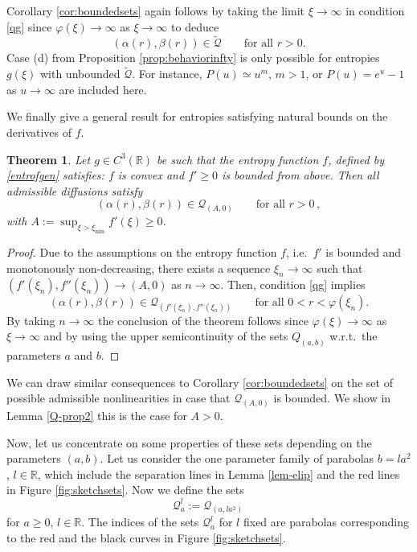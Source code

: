 \documentclass[reqno]{amsart}
\newtheorem{theorem}[lemma]{Theorem}
\newcommand{\R}{\mathbb{R}}
\begin{document}
Corollary \ref{cor:boundedsets} again follows by taking the limit $\xi\to\infty$ in condition \eqref{qg} since $\varphi(\xi)\to\infty$ as $\xi\to\infty$ to deduce
\begin{equation*}
 (\alpha(r),\beta(r))\in\tilde{\mathcal{Q}} \qquad \mbox{for all } r>0  .
\end{equation*}
Case (d) from Proposition \ref{prop:behaviorinfty} is only possible for entropies $g(\xi)$ with unbounded $\tilde{\mathcal{Q}}$. For instance, $P(u)\simeq u^m$, $m>1$, or $P(u)=e^u-1$ as $u\to \infty$ are included here.

We finally give a general result for entropies satisfying natural bounds on the derivatives of $f$.
%
\begin{theorem}\label{fconvex}
  Let $g\in C^3(\R)$ be such that the entropy function $f$,  
  defined by \eqref{entrofgen} satisfies: $f$ is convex and $f'\ge0$ is bounded from above. Then all admissible diffusions satisfy 
  $$
  (\alpha(r),\beta(r))\in\mathcal{Q}_{(A,0)} \qquad \mbox{for all } r>0  \,,
$$
with $A:=\sup_{\xi>\xi_{\min}} f'(\xi)\geq 0$. \\
\end{theorem}
%
\begin{proof}
Due to the assumptions on the entropy function $f$, i.e.\ $f'$ is bounded and monotonously non-decreasing, there exists a sequence $\xi_n\to \infty$ such that $(f'(\xi_n),f''(\xi_n))\to (A,0)$ as $n\to \infty$. Then, condition \eqref{qg} implies
\begin{equation*}
 (\alpha(r),\beta(r))\in\mathcal{Q}_{(f'(\xi_n),f''(\xi_n))} \qquad \mbox{for all } 0<r<\varphi(\xi_n)  . 
\end{equation*}
By taking $n\to\infty$ the conclusion of the theorem follows since $\varphi(\xi)\to\infty$ as $\xi\to\infty$ and by using the upper semicontinuity of the sets $Q_{(a,b)}$ w.r.t.\  the parameters $a$ and $b$.
\end{proof}

We can draw similar consequences to Corollary \ref{cor:boundedsets} on the set of possible admissible nonlinearities in case that $\mathcal{Q}_{(A,0)}$ is bounded. We show in Lemma \ref{Q-prop2} this is the case for $A>0$.



Now, let us concentrate on some properties of these sets depending on the parameters $(a,b)$. Let us consider the one parameter family of parabolas $b=la^2$, $l\in\R$, which include the separation lines in Lemma \ref{lem-elip} and the red lines in Figure \ref{fig:sketchsets}. Now we define the sets
$$
\mathcal{Q}_{a}^l :=\mathcal{Q}_{(a, l a^2)}\,
$$
for $a\ge 0$, $l\in\R$. The indices of the sets $\mathcal{Q}_{a}^l$ for $l$ fixed are parabolas corresponding to the red and the black curves in Figure \ref{fig:sketchsets}.
\end{document}
